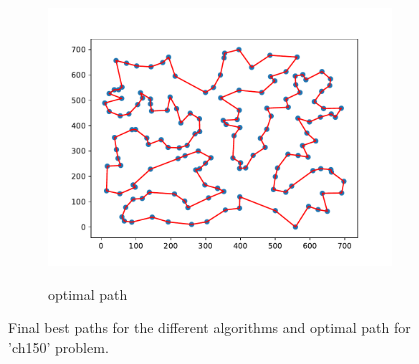\documentclass[12pt]{article}
\theoremstyle{plain}
\theoremstyle{definition}
\theoremstyle{remark}
\begin{document}
\begin{figure}[ht]
\begin{subfigure}{.5\textwidth}
		\includegraphics[scale = 0.44]{../../Implementation/gen/optimal_path_ch150}
		\label{fig:optimal_path_ch150}
		\caption{optimal path}
	\end{subfigure}
	\caption{Final best paths for the different algorithms and optimal path for 'ch150' problem.}
	\label{fig:final_paths_ch150}
\end{figure}
\newpage
\end{document}
